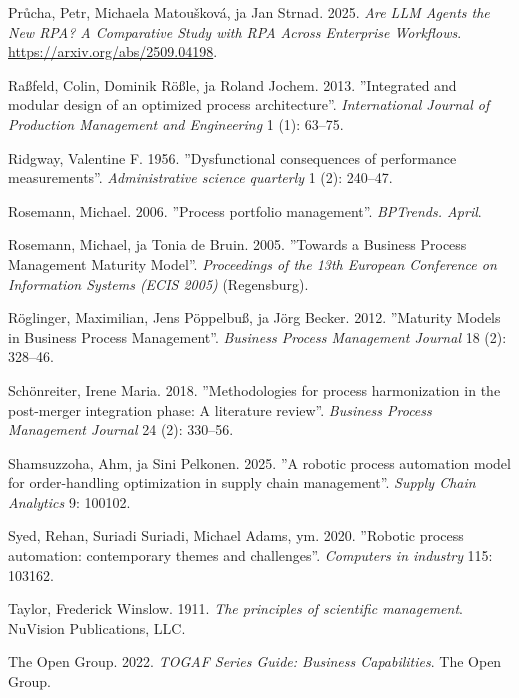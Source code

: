 \documentclass[
  finnish,
  letterpaper,
  DIV=11,
  numbers=noendperiod,
  oneside]{scrreprt}
\newlength{\cslhangindent}
\newenvironment{CSLReferences}[2] %
 {\begin{list}{}{%
  \setlength{\itemindent}{0pt}
  \setlength{\leftmargin}{0pt}
  \setlength{\parsep}{0pt}
  \ifodd #1
   \setlength{\leftmargin}{\cslhangindent}
   \setlength{\itemindent}{-1\cslhangindent}
  \fi
  \setlength{\itemsep}{#2\baselineskip}}}
 {\end{list}}
\begin{document}
\begin{CSLReferences}{1}{1}
Průcha, Petr, Michaela Matoušková, ja Jan Strnad. 2025. \emph{Are LLM
Agents the New RPA? A Comparative Study with RPA Across Enterprise
Workflows}. \url{https://arxiv.org/abs/2509.04198}.

Raßfeld, Colin, Dominik Rößle, ja Roland Jochem. 2013. {''Integrated and
modular design of an optimized process architecture''}.
\emph{International Journal of Production Management and Engineering} 1
(1): 63--75.

Ridgway, Valentine F. 1956. {''Dysfunctional consequences of performance
measurements''}. \emph{Administrative science quarterly} 1 (2): 240--47.

Rosemann, Michael. 2006. {''Process portfolio management''}.
\emph{BPTrends. April}.

Rosemann, Michael, ja Tonia de Bruin. 2005. {''Towards a Business
Process Management Maturity Model''}. \emph{Proceedings of the 13th
European Conference on Information Systems (ECIS 2005)} (Regensburg).

Röglinger, Maximilian, Jens Pöppelbuß, ja Jörg Becker. 2012. {''Maturity
Models in Business Process Management''}. \emph{Business Process
Management Journal} 18 (2): 328--46.

Schönreiter, Irene Maria. 2018. {''Methodologies for process
harmonization in the post-merger integration phase: A literature
review''}. \emph{Business Process Management Journal} 24 (2): 330--56.

Shamsuzzoha, Ahm, ja Sini Pelkonen. 2025. {''A robotic process
automation model for order-handling optimization in supply chain
management''}. \emph{Supply Chain Analytics} 9: 100102.

Syed, Rehan, Suriadi Suriadi, Michael Adams, ym. 2020. {''Robotic
process automation: contemporary themes and challenges''}.
\emph{Computers in industry} 115: 103162.

Taylor, Frederick Winslow. 1911. \emph{The principles of scientific
management}. NuVision Publications, LLC.

The Open Group. 2022. \emph{TOGAF Series Guide: Business Capabilities}.
The Open Group.


\end{CSLReferences}
\end{document}
